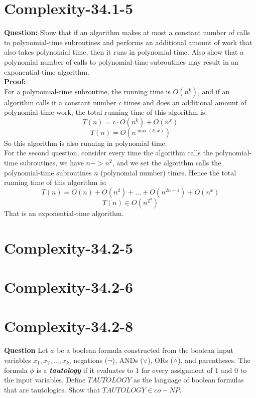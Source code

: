 \documentclass[12pt]{article}
\begin{document}
\section{Complexity-34.1-5}
\textbf{Question:} Show that if an algorithm makes at most a constant number of calls to polynomial-time subroutines and performs an additional amount of work that also takes polynomial time, then it runs in polynomial time. Also show that a polynomial number of
calls to polynomial-time subroutines may result in an exponential-time algorithm.\\
\textbf{Proof:}\\
For a polynomial-time subroutine, the running time is \(O(n^k)\), and if an algorithm calls it a constant number \(c\) times and does an additional amount of polynomial-time work, the total running time of this algorithm is:
\[T(n) = c \cdot O(n^k) + O(n^x)\]
\[T(n) = O(n^{\max(k,x)}) \]
So this algorithm is also running in polynomial time. \\
For the second question, consider every time the algorithm calls the polynomial-time subroutines, we have \(n->n^2\), and we set the algorithm calls the polynomial-time subroutines \(n\) (polynomial number) times.
Hence the total running time of this algorithm is:
\[T(n) = O(n) + O(n^2) + ...+O(n^{2n-1}) + O(n^x) \]
\[T(n) \in O(n^{2^n})\]
That is an exponential-time algorithm.



\section{Complexity-34.2-5}

\section{Complexity-34.2-6}

\section{Complexity-34.2-8}
\textbf{Question}
Let $\phi$ be a boolean formula constructed from the boolean input variables $x_1, x_2, \dots, x_k$, negations ($\neg$), ANDs ($\vee$), ORs ($\wedge$), and parentheses. The formula $\phi$ is a \textit{\textbf{tautology}} if it evaluates to $1$ for every assignment of $1$ and $0$ to the input variables. Define $TAUTOLOGY$ as the language of boolean formulas that are tautologies. Show that $TAUTOLOGY \in co-NP$.
\end{document}
